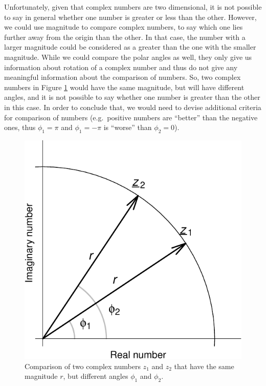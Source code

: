 \documentclass[
]{book}
\begin{document}
Unfortunately, given that complex numbers are two dimensional, it is not possible to say in general whether one number is greater or less than the other. However, we could use magnitude to compare complex numbers, to say which one lies further away from the origin than the other. In that case, the number with a larger magnitude could be considered as a greater than the one with the smaller magnitude. While we could compare the polar angles as well, they only give us information about rotation of a complex number and thus do not give any meaningful information about the comparison of numbers. So, two complex numbers in Figure \ref{fig:complexPlaneCircle} would have the same magnitude, but will have different angles, and it is not possible to say whether one number is greater than the other in this case. In order to conclude that, we would need to devise additional criteria for comparison of numbers (e.g.~positive numbers are ``better'' than the negative ones, thus \(\phi_1=\pi\) and \(\phi_1=-\pi\) is ``worse'' than \(\phi_2=0\)).

\begin{figure}
\centering
\includegraphics{Svetunkov---Svetunkov---Complex-Dynamic-Models_files/figure-latex/complexPlaneCircle-1.pdf}
\caption{\label{fig:complexPlaneCircle}Comparison of two complex numbers \(z_1\) and \(z_2\) that have the same magnitude \(r\), but different angles \(\phi_1\) and \(\phi_2\).}
\end{figure}
\end{document}
